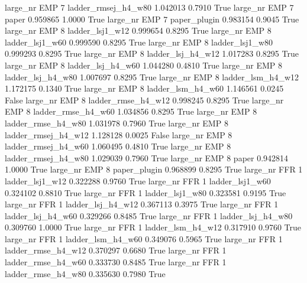   large_nr      EMP                 7 ladder_rmsej_h4_w80   1.042013      0.7910    True
  large_nr      EMP                 7               paper   0.959865      1.0000    True
  large_nr      EMP                 7        paper_plugin   0.983154      0.9045    True
  large_nr      EMP                 8     ladder_lsj1_w12   0.999654      0.8295    True
  large_nr      EMP                 8     ladder_lsj1_w60   0.999590      0.8295    True
  large_nr      EMP                 8     ladder_lsj1_w80   0.999293      0.8295    True
  large_nr      EMP                 8   ladder_lsj_h4_w12   1.017283      0.8295    True
  large_nr      EMP                 8   ladder_lsj_h4_w60   1.044280      0.4810    True
  large_nr      EMP                 8   ladder_lsj_h4_w80   1.007697      0.8295    True
  large_nr      EMP                 8   ladder_lsm_h4_w12   1.172175      0.1340    True
  large_nr      EMP                 8   ladder_lsm_h4_w60   1.146561      0.0245   False
  large_nr      EMP                 8  ladder_rmse_h4_w12   0.998245      0.8295    True
  large_nr      EMP                 8  ladder_rmse_h4_w60   1.034856      0.8295    True
  large_nr      EMP                 8  ladder_rmse_h4_w80   1.031978      0.7960    True
  large_nr      EMP                 8 ladder_rmsej_h4_w12   1.128128      0.0025   False
  large_nr      EMP                 8 ladder_rmsej_h4_w60   1.060495      0.4810    True
  large_nr      EMP                 8 ladder_rmsej_h4_w80   1.029039      0.7960    True
  large_nr      EMP                 8               paper   0.942814      1.0000    True
  large_nr      EMP                 8        paper_plugin   0.968899      0.8295    True
  large_nr      FFR                 1     ladder_lsj1_w12   0.322288      0.9760    True
  large_nr      FFR                 1     ladder_lsj1_w60   0.324102      0.8810    True
  large_nr      FFR                 1     ladder_lsj1_w80   0.323581      0.9195    True
  large_nr      FFR                 1   ladder_lsj_h4_w12   0.367113      0.3975    True
  large_nr      FFR                 1   ladder_lsj_h4_w60   0.329266      0.8485    True
  large_nr      FFR                 1   ladder_lsj_h4_w80   0.309760      1.0000    True
  large_nr      FFR                 1   ladder_lsm_h4_w12   0.317910      0.9760    True
  large_nr      FFR                 1   ladder_lsm_h4_w60   0.349076      0.5965    True
  large_nr      FFR                 1  ladder_rmse_h4_w12   0.370297      0.6680    True
  large_nr      FFR                 1  ladder_rmse_h4_w60   0.333730      0.8485    True
  large_nr      FFR                 1  ladder_rmse_h4_w80   0.335630      0.7980    True
